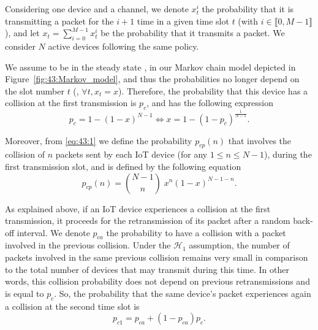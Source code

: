 Considering one device and a channel,
we denote $x_t^i$ the probability that it is transmitting a packet for the $i+1$ time in a given time slot $t$ (with $i\in \llbracket 0, M-1 \rrbracket$),
and let $x_t = \sum_{i=0}^{M-1}x_t^i$ be the probability that it transmits a packet.
We consider $N$ active devices following the same policy.

%

We assume to be in the steady state \cite{Norris98}, in our Markov chain model depicted in Figure~\ref{fig:43:Markov_model}, and thus the probabilities no longer depend on the slot number $t$ (\ie, $\forall t, x_t=x$).
Therefore, the probability that this device has a collision at the first transmission is $p_c$, and has the following expression
\begin{equation}\label{eq:43:1}
	p_c = 1-\left(1-x\right)^{N-1} \iff x = 1-\left(1-p_c\right)^{\frac{1}{N-1}}.
\end{equation}

Moreover, from \eqref{eq:43:1} we define the probability $p_{cp}(n)$ that involves the collision of $n$ packets sent by each IoT device (for any $1\leq n \leq N-1$), during the first transmission slot, and is defined by the following equation
\begin{equation*}\label{eq:43:2}
	p_{cp}(n) = {N-1 \choose n} \; x^n \left(1-x\right)^{N-1-n}.
\end{equation*}

As explained above, if an IoT device experiences a collision at the first transmission, it proceeds for the retransmission of its packet after a random back-off interval.
We denote $p_{ca}$ the probability to have a collision with a packet involved in the previous collision.
Under the $\mathcal{H}_{1}$ assumption, the number of packets involved in the same previous collision remains very small in comparison to the total number of devices that may transmit during this time. In other words, this collision probability does not depend on previous retransmissions and is equal to $p_c$.
So, the probability that the same device's packet experiences again a collision at the second time slot is
%
\begin{equation}\label{eq:43:decomppc1}
	p_{c1} = p_{ca}+\left(1-p_{ca} \right)p_c.
\end{equation}


